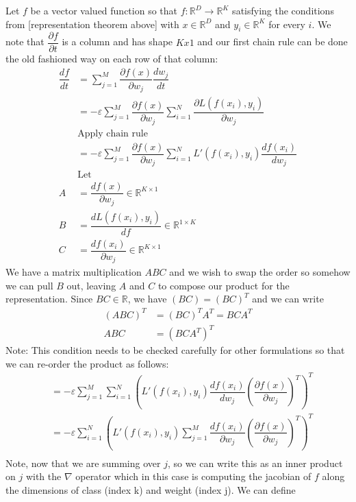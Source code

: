 Let $f$ be a vector valued function so that $f : \mathbb{R}^D \to \mathbb{R}^K$  satisfying the conditions from [representation theorem above] with $x \in \mathbb{R}^D$ and $y_i \in \mathbb{R}^K$ for every $i$. We note that $\dfrac{\partial f}{\partial t}$ is a column and has shape $Kx1$ and our first chain rule can be done the old fashioned way on each row of that column:
\begin{align}
    \dfrac{d f}{d t} &= \sum_{j=1}^M \dfrac{\partial f(x)}{\partial w_j} \dfrac{d w_j}{d t}\\
    &= -\varepsilon \sum_{j=1}^M \dfrac{\partial f(x)}{\partial w_j} \sum_{i=1}^N \dfrac{\partial L(f(x_i), y_i)}{\partial w_j}\\
    &\text{Apply chain rule}\\
    &= -\varepsilon \sum_{j=1}^M \dfrac{\partial f(x)}{\partial w_j}
      \sum_{i=1}^N  L'(f(x_i), y_i) \dfrac{d f(x_i)}{d w_j}\\
    &\text{Let}\\
    A &= \dfrac{d f(x)}{\partial w_j} \in \mathbb{R}^{K \times 1}\\
    B &= \dfrac{d L(f(x_i), y_i)}{d f} \in \mathbb{R}^{1 \times K}\\
    C &= \dfrac{d f(x_i)}{\partial w_j} \in \mathbb{R}^{K \times 1}
\end{align}
We have a matrix multiplication $ABC$ and we wish to swap the order so somehow we can pull $B$ out, leaving $A$ and $C$ to compose our product for the representation. Since $BC \in \mathbb{R}$, we have $(BC) = (BC)^T$ and we can write
\begin{align}
    (ABC)^T &= (BC)^TA^T = BCA^T\\
    ABC &= (BCA^T)^T
\end{align}
Note: This condition needs to be checked carefully for other formulations so that we can re-order the product as follows:
\begin{align}
        &= -\varepsilon \sum_{j=1}^M  \sum_{i=1}^N \left(L'(f(x_i), y_i) 
        \dfrac{d f(x_i)}{d w_j} \left(\dfrac{\partial f(x)}{\partial  w_j}\right)^T\right)^T
        \\
    &= -\varepsilon \sum_{i=1}^N \left(L'(f(x_i), y_i) 
    \sum_{j=1}^M \dfrac{d f(x_i)}{\partial w_j} \left(\dfrac{\partial f(x)}{\partial w_j}\right)^T\right)^T\\        
\end{align}
Note, now that we are summing over $j$, so we can write this as an inner product on $j$ with the $\nabla$ operator which in this case is computing the jacobian of $f$ along the dimensions of class (index k) and weight (index j). We can define 
